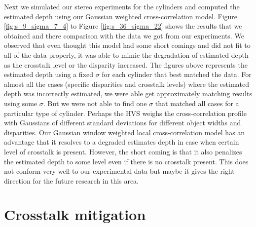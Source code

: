 Next we simulated our stereo experiments for the cylinders and computed the estimated depth using our Gaussian weighted cross-correlation model. Figure \ref{fig:s_9_sigma_7_4} to Figure \ref{fig:s_36_sigma_22} shows the results that we obtained and there comparison with the data we got from our experiments. We observed that even thought this model had some short comings and did not fit to all of the data properly, it was able to mimic the degradation of estimated depth as the crosstalk level or the disparity increased. The figures above represents the estimated depth using a fixed $\sigma$ for each cylinder that best matched the data. For almost all the cases (specific disparities and crosstalk levels) where the estimated depth was incorrectly estimated, we were able get approximately matching results using some $\sigma$. But we were not able to find one $\sigma$ that matched all cases for a particular type of cylinder. Perhaps the HVS weighs the cross-correlation profile with Gaussians of different standard deviations for different object widths and disparities. Our Gaussian window weighted local cross-correlation model has an advantage that it resolves to a degraded estimates depth in case when certain level of crosstalk is present. However, the short coming is that it also penalizes the estimated depth to some level even if there is no crosstalk present. This does not conform very well to our experimental data but maybe it gives the right direction for the future research in this area.

\section{Crosstalk mitigation}
